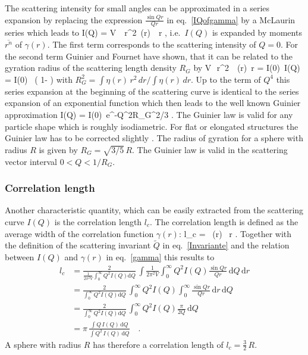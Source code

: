 The scattering intensity for small angles can be approximated in a series expansion
by replacing the expression $\frac{\sin Qr}{Qr}$ in eq.\ \ref{IQofgamma}
by a McLaurin series which leads to
\BE
I(Q) = V\, \pi\, r^2\, \gamma(r)\,
        \, r
       \quad ,
\EE
i.e.\ $I(Q)$ is expanded by moments $\overline{r^n}$ of $\gamma(r)$.
The first term corresponds to the scattering intensity of $Q=0$.
For the second term Guinier and Fournet \cite{book:Guinier:Fournet}
have shown, that it can be related to the gyration radius of the scattering length density
$R_G$ by
\BE
V\,\pi\, r^2\, \, \gamma(r)\, r = I(0)\,
     \quad \Rightarrow \quad
   I(Q) = I(0) \, \left( 1- \right)
\EE
with $R_G^2 = \int \eta(r)\, r^2\, dr/\int \eta(r)\, dr$.
Up to the term of $Q^4$ this series expansion at the beginning of the scattering curve
is identical to the series expansion of an exponential function which then leads to
the well known Guinier approximation
\BE
I(Q) = I(0)\, e^{-Q^2R_G^2/3} .
\label{eq:Guinier}
\EE
The Guinier law is valid for any particle shape which is roughly
isodiametric. For flat or elongated structures the Guinier law has to be
corrected slightly \cite{book:Feigin:Svergun,book:Guinier:Fournet}.
The radius of gyration for a sphere with radius $R$ is given by $R_G=\sqrt{3/5}\, R$.
The Guinier law is valid in the scattering vector interval $0<Q<1/R_G$.

\subsubsection{Correlation length}

Another characteristic quantity, which can be easily extracted from
the scattering curve $I(Q)$ is the correlation length $l_c$. The correlation length
is defined as the average width of the correlation function  $\gamma(r)$:
\BE
l_c = \, \int \gamma(r) \, r .
\label{eq:lc1}
\EE
Together with the definition of the scattering invariant $\tilde Q$ in
eq.\  \ref{Invariante} and the relation between $I(Q)$ and $\gamma(r)$ in
eq.\ \ref{gamma} this results to
\begin{align}
l_c & =  \frac{2}{\frac{1}{2\pi^2 V}\int_0^\infty Q^2 I(Q)\mathrm{d}Q}\, \int \frac{1}{2\pi^2 V}\int_0^\infty Q^2 I(Q)\frac{\sin Qr}{Qr}\,\mathrm{d}Q \, \mathrm{d}r  \nonumber \\
&= \frac{2}{\int_0^\infty Q^2 I(Q)\mathrm{d}Q}\, \int_0^\infty Q^2 I(Q) \int_0^\infty \frac{\sin Qr}{Qr} \, \mathrm{d}r \, \mathrm{d}Q \nonumber \\
&= \frac{2}{\int_0^\infty Q^2 I(Q)\mathrm{d}Q}\, \int_0^\infty Q^2 I(Q) \frac{\pi}{2Q} \, \mathrm{d}Q \nonumber \\
& = \pi\, \frac{\int Q\, I(Q)\, \mathrm{d}Q}{\int Q^2\, I(Q)\, \mathrm{d}Q} \quad .
\label{eq:lc2}
\end{align}
A sphere with radius $R$ has therefore a correlation length of $l_c = \frac{3}{2}\, R$.

